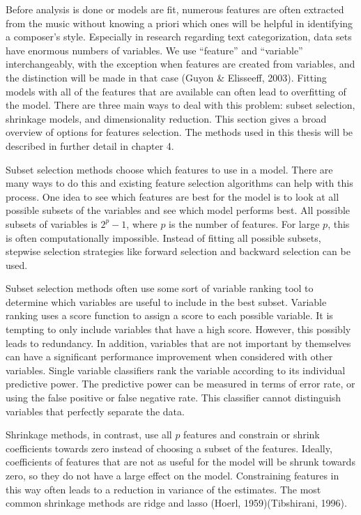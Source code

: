 \documentclass[12pt,twoside]{reedthesis}
\theoremstyle{definition}
\theoremstyle{definition}
\theoremstyle{definition}
\theoremstyle{remark}
\begin{document}
Before analysis is done or models are fit, numerous features are often
extracted from the music without knowing a priori which ones will be
helpful in identifying a composer's style. Especially in research
regarding text categorization, data sets have enormous numbers of
variables. We use ``feature'' and ``variable'' interchangeably, with the
exception when features are created from variables, and the distinction
will be made in that case (Guyon \& Elisseeff, 2003). Fitting models
with all of the features that are available can often lead to
overfitting of the model. There are three main ways to deal with this
problem: subset selection, shrinkage models, and dimensionality
reduction. This section gives a broad overview of options for features
selection. The methods used in this thesis will be described in further
detail in chapter 4.

Subset selection methods choose which features to use in a model. There
are many ways to do this and existing feature selection algorithms can
help with this process. One idea to see which features are best for the
model is to look at all possible subsets of the variables and see which
model performs best. All possible subsets of variables is \(2^p-1\),
where \(p\) is the number of features. For large \(p\), this is often
computationally impossible. Instead of fitting all possible subsets,
stepwise selection strategies like forward selection and backward
selection can be used.

Subset selection methods often use some sort of variable ranking tool to
determine which variables are useful to include in the best subset.
Variable ranking uses a score function to assign a score to each
possible variable. It is tempting to only include variables that have a
high score. However, this possibly leads to redundancy. In addition,
variables that are not important by themselves can have a significant
performance improvement when considered with other variables. Single
variable classifiers rank the variable according to its individual
predictive power. The predictive power can be measured in terms of error
rate, or using the false positive or false negative rate. This
classifier cannot distinguish variables that perfectly separate the
data.

Shrinkage methods, in contrast, use all \(p\) features and constrain or
shrink coefficients towards zero instead of choosing a subset of the
features. Ideally, coefficients of features that are not as useful for
the model will be shrunk towards zero, so they do not have a large
effect on the model. Constraining features in this way often leads to a
reduction in variance of the estimates. The most common shrinkage
methods are ridge and lasso (Hoerl, 1959)(Tibshirani, 1996).
\end{document}
